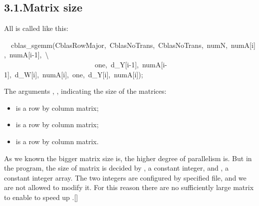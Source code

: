 \documentclass{article}
\begin{document}
\subsection{3.1.\hspace*{0.5em}Matrix size}\label{sec-matrix-size}%

\noindent{}All  is called like this:%
\begin{mdpre}%
\noindent~~cblas\_sgemm({CblasRowMajor},~{CblasNoTrans},~{CblasNoTrans},~numN,~numA[i],~numA[i-{1}],~\textbackslash{}\\
~~~~~~~~~~~~~~~~~~~~~~~~~~one,~d\_Y[i-{1}],~numA[i-{1}],~d\_W[i],~numA[i],~one,~d\_Y[i],~numA[i]);%
\end{mdpre}\noindent{}The arguments , ,  indicating the size of the matrices:

\begin{itemize}[noitemsep,topsep=\mdcompacttopsep]%

\item{} is a  row by  column matrix;%

\item{} is a  row by  column matrix;%

\item{} is a  row by  column matrix.%
\end{itemize}%

\noindent{}As we known the bigger matrix size is, the higher degree of  parallelism is. But in the  program, the size of matrix is decided by , a constant integer, and , a constant integer array. The two integers are configured by specified file, and we are not allowed to modify it. For this reason there are no sufficiently large matrix to enable  to speed up .[]%
\end{document}
